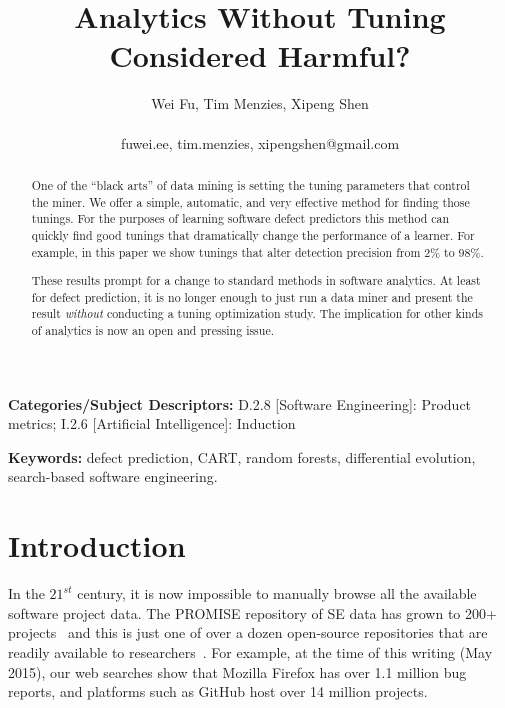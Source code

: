\documentclass{sig-alternative}
\begin{document}
\title{ Analytics Without  Tuning Considered Harmful?}
\author{\alignauthor Wei Fu, Tim Menzies, Xipeng Shen \\
       \\
       fuwei.ee, tim.menzies, xipengshen@gmail.com}
\maketitle 
\thispagestyle{plain}
\pagestyle{plain}
\begin{abstract}
One of the ``black arts'' of data mining is setting the tuning
parameters that control  the miner.  We offer a simple,
automatic, and very effective  method for finding those tunings.
For the purposes of learning
software defect predictors this  method can quickly
find  good tunings that  dramatically change   the performance of a learner.
For example,
in this paper we show   tunings that  alter detection  precision  
 from 2\% to 98\%.

These results prompt for a change to standard methods in software analytics.
At least for defect prediction, 
it is no longer enough to just run a data miner and present the result
{\em without}  conducting a tuning optimization study.
The implication for other kinds of  analytics is now  an open and pressing issue.


\end{abstract}

\vspace{1mm}
\noindent
{\bf Categories/Subject Descriptors:} 
D.2.8 [Software Engineering]: Product metrics;
I.2.6 [Artificial Intelligence]: Induction

 
\vspace{1mm}
\noindent
{\bf Keywords:} defect prediction, CART, random forests,
differential evolution,
search-based software engineering.

 
 
\section{Introduction}
 
In the $21^{st}$ century, it is now impossible
to manually browse all the available software project
data. The PROMISE repository of SE data has grown to 200+ projects~\cite{promise15}
and this is just one of over a dozen open-source repositories
that are readily available to researchers~\cite{rod12}.
For example, at the time of this writing (May  2015), our web searches show that Mozilla Firefox has over 1.1 million bug reports, and platforms such as GitHub host over 14 million projects. 
\end{document}

